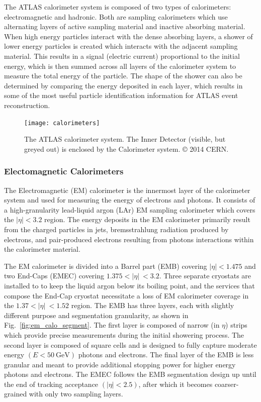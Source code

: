 The ATLAS calorimeter system is composed of two types of calorimeters: electromagnetic and hadronic.
Both are sampling calorimeters which use alternating layers of active sampling material and inactive absorbing material.
When high energy particles interact with the dense absorbing layers, a shower of lower energy particles is created which interacts with the adjacent sampling material.
This results in a signal (electric current) proportional to the initial energy, which is then summed across all layers of the calorimeter system to measure the total energy of the particle.
The shape of the shower can also be determined by comparing the energy deposited in each layer, which results in some of the most useful particle identification information for ATLAS event reconstruction.

\begin{figure}
	\centering
	\texttt{[image: calorimeters]}
	\caption{The ATLAS calorimeter system. The Inner Detector (visible, but greyed out) is enclosed by the Calorimeter system. © 2014 CERN.}
	\label{fig:calorimeter}
\end{figure}

\subsubsection{Electomagnetic Calorimeters}
The Electromagnetic (EM) calorimeter is the innermost layer of the calorimeter system and used for measuring the energy of electrons and photons.
It consists of a high-granularity lead-liquid argon (LAr) EM sampling calorimeter which covers the $|\eta| < 3.2$ region.
The energy deposits in the EM calorimeter primarily result from the charged particles in jets, bremsstrahlung radiation produced by electrons, and pair-produced electrons resulting from photons interactions within the calorimeter material.

The EM calorimeter is divided into a Barrel part (EMB) covering $|\eta| < 1.475$ and two End-Caps (EMEC) covering $1.375 < |\eta|\ < 3.2$.
Three separate cryostats are installed to to keep the liquid argon below its boiling point, and the services that compose the End-Cap cryostat necessitate a loss of EM calorimeter coverage in the $1.37 < |\eta|\ < 1.52$ region.
The EMB has three layers, each with slightly different purpose and segmentation granularity, as shown in Fig.~\ref{fig:em_calo_segment}.
The first layer is composed of narrow (in $\eta$) strips which provide precise measurements during the initial showering process.
The second layer is composed of square cells and is designed to fully capture moderate energy $(E < 50 \ \mathrm{GeV})$ photons and electrons.
The final layer of the EMB is less granular and meant to provide additional stopping power for higher energy photons and electrons.
The EMEC follows the EMB segmentation design up until the end of tracking acceptance $(|\eta| < 2.5)$, after which it becomes coarser-grained with only two sampling layers.

